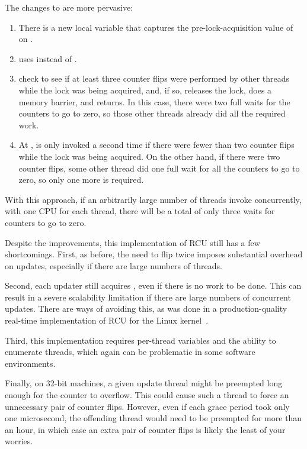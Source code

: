 \begin{lineref}
The changes to  are more pervasive:
\begin{enumerate}
\item	There is a new  local variable that captures
	the pre-lock-acquisition value of  on
	.
\item	{} uses  instead of .
\item	{} check to see if at least three counter flips were
	performed by other threads while the lock was being acquired,
	and, if so, releases the lock, does a memory barrier, and returns.
	In this case, there were two full waits for the counters to
	go to zero, so those other threads already did all the required work.
\item	At ,  is only
	invoked a second time if there were fewer than two counter flips
	while the lock was being acquired.
	On the other hand, if there were two counter flips, some other
	thread did one full wait for all the counters to go to zero,
	so only one more is required.
\end{enumerate}
\end{lineref}

With this approach, if an arbitrarily large number of threads invoke
 concurrently, with one CPU for each thread, there
will be a total of only three waits for counters to go to zero.

Despite the improvements, this implementation of RCU still
has a few shortcomings.
First, as before, the need to flip  twice imposes substantial
overhead on updates, especially if there are large
numbers of threads.

Second, each updater still acquires , even if there
is no work to be done.
This can result in a severe scalability limitation
if there are large numbers of concurrent updates.
There are ways of avoiding this, as was done in a
production-quality real-time implementation of RCU for the Linux
kernel~\cite{PaulEMcKenney2007PreemptibleRCU}.

Third, this implementation requires per-thread variables
and the ability to enumerate threads, which again can be
problematic in some software environments.

Finally, on 32-bit machines, a given update thread might be
preempted long enough for the 
counter to overflow.
This could cause such a thread to force an unnecessary
pair of counter flips.
However, even if each grace period took only one
microsecond, the offending thread would need to be
preempted for more than an hour, in which case an
extra pair of counter flips is likely the least of
your worries.

